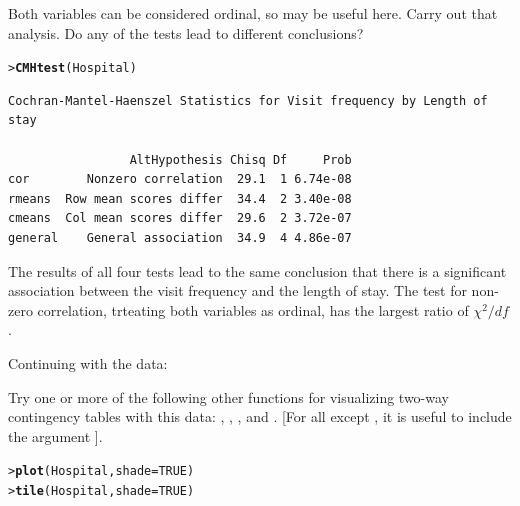 \documentclass[10pt]{report}\usepackage[]{graphicx}\usepackage[]{color}
\makeatletter
\newcommand{\hlnum}[1]{\textcolor[rgb]{0.686,0.059,0.569}{#1}}%
\newcommand{\hlstd}[1]{\textcolor[rgb]{0.345,0.345,0.345}{#1}}%
\newcommand{\hlkwc}[1]{\textcolor[rgb]{0.333,0.667,0.333}{#1}}%
\newcommand{\hlkwd}[1]{\textcolor[rgb]{0.737,0.353,0.396}{\textbf{#1}}}%
\newenvironment{kframe}{%
 \def\at@end@of@kframe{}%
 \ifinner\ifhmode%
  \def\at@end@of@kframe{\end{minipage}}%
  \begin{minipage}{\columnwidth}%
 \fi\fi%
 \def\FrameCommand##1{\hskip\@totalleftmargin \hskip-\fboxsep
 \colorbox{shadecolor}{##1}\hskip-\fboxsep
     \hskip-\linewidth \hskip-\@totalleftmargin \hskip\columnwidth}%
 \MakeFramed {\advance\hsize-\width
   \@totalleftmargin\z@ \linewidth\hsize
   \@setminipage}}%
 {\par\unskip\endMakeFramed%
 \at@end@of@kframe}
\newenvironment{knitrout}{}{} %
\renewenvironment{knitrout}{\small\renewcommand{\baselinestretch}{.85}}{} %
\makeatother
\begin{document}
\begin{Exercises}
\begin{enumerate*}
\begin{ans}
\begin{knitrout}
\end{knitrout}
      \end{ans}
      
      \item Both variables can be considered ordinal, so
       may be useful here.  Carry out that
      analysis.  Do any of the tests lead to different conclusions?
      \begin{ans}
\begin{knitrout}\footnotesize
{}\color{fgcolor}\begin{kframe}
\begin{alltt}
\hlstd{> }\hlkwd{CMHtest}\hlstd{(Hospital)}
\end{alltt}
\begin{verbatim}
Cochran-Mantel-Haenszel Statistics for Visit frequency by Length of stay 

                 AltHypothesis Chisq Df     Prob
cor        Nonzero correlation  29.1  1 6.74e-08
rmeans  Row mean scores differ  34.4  2 3.40e-08
cmeans  Col mean scores differ  29.6  2 3.72e-07
general    General association  34.9  4 4.86e-07
\end{verbatim}
\end{kframe}
\end{knitrout}
      The results of all four tests lead to the same conclusion that there is a
      significant association between the visit frequency and the length of stay.
      The test for non-zero correlation, trteating both variables as ordinal, has the
      largest ratio of $\chi^2 /df$.
      \end{ans}
      
    \end{enumerate*}

  \exercise Continuing with the  data:
    \begin{enumerate*}
      \item Try one or more of the following other functions for visualizing two-way contingency tables with this data: 
      , , , and .  
      [For all except , it is useful to include the argument ].
      \begin{ans}
\begin{knitrout}\footnotesize
{}\color{fgcolor}\begin{kframe}
\begin{alltt}
\hlstd{> }\hlkwd{plot}\hlstd{(Hospital,} \hlkwc{shade}\hlstd{=}\hlnum{TRUE}\hlstd{)}
\hlstd{> }\hlkwd{tile}\hlstd{(Hospital,} \hlkwc{shade}\hlstd{=}\hlnum{TRUE}\hlstd{)}
\end{alltt}
\end{kframe}


\end{knitrout}
\end{ans}
\end{enumerate*}
\end{Exercises}
\end{document}
